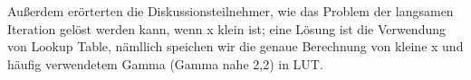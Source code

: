 \documentclass[course=erap]{aspdoc}
\begin{document}
\par
Außerdem erörterten die Diskussionsteilnehmer, wie das Problem der langsamen Iteration gelöst werden kann, wenn x klein ist; eine Lösung ist die Verwendung von Lookup Table\cite{jungck2011packetC}, nämllich speichen wir die genaue Berechnung von kleine x und häufig verwendetem Gamma (Gamma nahe 2,2) in LUT.



\end{document}
